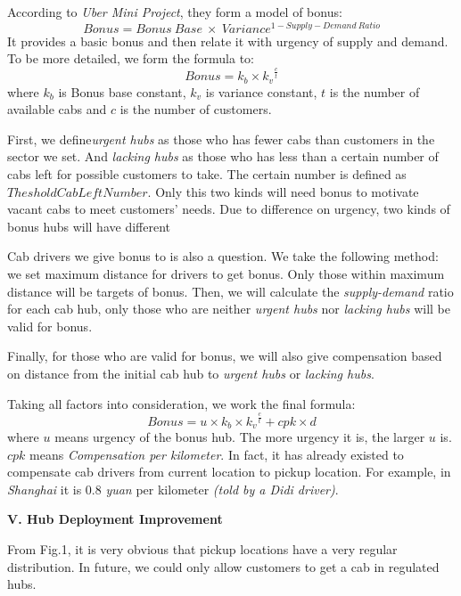 \documentclass{article}
\begin{document}
\qquad According to \emph{Uber Mini Project}, they form a model of bonus:
\begin{displaymath}
Bonus = Bonus\ Base\ \times\ Variance^{1-Supply-Demand\ Ratio}  
\end{displaymath}
It provides a basic bonus and then relate it with urgency of supply and demand. To be more detailed, we form the formula to:
\begin{displaymath}
Bonus = k_b \times {k_v}^{\frac{c}{t}}
\end{displaymath}
where \(k_b\) is Bonus base constant, \(k_v\) is variance constant, \(t\) is the number of available cabs and \(c\) is the number of customers.

\qquad First, we define\emph{urgent hubs} as those who has fewer cabs than customers in the sector we set. And \emph{lacking hubs} as those who has less than a certain number of cabs left for possible customers to take. The certain number is defined as \(Theshold Cab Left Number\). Only this two kinds will need bonus to motivate vacant cabs to meet customers' needs. Due to difference on urgency, two kinds of bonus hubs will have different

\qquad Cab drivers we give bonus to is also a question. We take the following method: we set maximum distance for drivers to get bonus. Only those within maximum distance will be targets of bonus. Then, we will calculate the \emph{supply-demand} ratio for each cab hub, only those who are neither \emph{urgent hubs} nor \emph{lacking hubs} will be valid for bonus.

\qquad Finally, for those who are valid for bonus, we will also give compensation based on distance from the initial cab hub to \emph{urgent hubs} or \emph{lacking hubs}.

\qquad Taking all factors into consideration, we work the final formula:
\begin{displaymath}
	Bonus = u\times k_b \times {k_v}^{\frac{c}{t}} + cpk\times d
\end{displaymath}
where \(u\) means urgency of the bonus hub. The more urgency it is, the larger \(u\) is. \(cpk\) means \emph{Compensation per kilometer}. In fact, it has already existed to compensate cab drivers from current location to pickup location. For example, in \emph{Shanghai} it is 0.8 \emph{yuan} per kilometer \emph{(told by a Didi driver)}.

\begin{center}
	\textbf{V. Hub Deployment Improvement}
\end{center}
\qquad From Fig.1, it is very obvious that pickup locations have a very regular distribution. In future, we could only allow customers to get a cab in regulated hubs.
\end{document}
